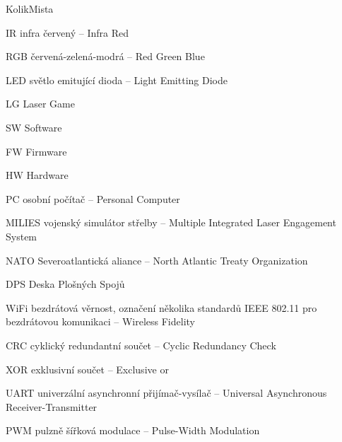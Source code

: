\begin{seznamzkratek}{KolikMista}

        {IR}
        {infra červený -- Infra Red}

        {RGB}
        {červená-zelená-modrá -- Red Green Blue}

        {LED}
        {světlo emitující dioda -- Light Emitting Diode}

        {LG}
        {Laser Game}

        {SW}
        {Software}

        {FW}
        {Firmware}

        {HW}
        {Hardware}

        {PC}
        {osobní počítač -- Personal Computer}

        {MILIES}
        {vojenský simulátor střelby -- Multiple Integrated Laser Engagement System}

        {NATO}
        {Severoatlantická aliance -- North Atlantic Treaty Organization}

        {DPS}
        {Deska Plošných Spojů}

        {WiFi}
        {bezdrátová věrnost, označení několika standardů IEEE 802.11 pro bezdrátovou komunikaci -- Wireless Fidelity}

        {CRC}
        {cyklický redundantní součet --  Cyclic Redundancy Check}

        {XOR}
        {exklusivní součet --  Exclusive or}

        {UART}
        {univerzální asynchronní přijímač-vysílač --  Universal Asynchronous Receiver-Transmitter}

        {PWM}
        {pulzně šířková modulace --  Pulse-Width Modulation}

\end{seznamzkratek}
